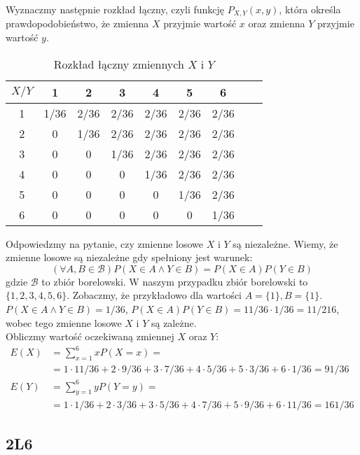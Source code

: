 \documentclass{article}
\begin{document}
\noindent
Wyznaczmy następnie rozkład łączny, czyli funkcję $P_{X,Y}(x,y)$, która określa prawdopodobieństwo, że zmienna $X$ przyjmie wartość $x$ oraz zmienna $Y$ przyjmie wartość $y$.
\begin{table}[h]
    \centering
    \begin{tabular}{c|cccccccc}
        $X/Y$ & 1 & 2 & 3 & 4 & 5 & 6 & & \\ \toprule
        1 & 1/36 & 2/36 & 2/36 & 2/36 & 2/36 & 2/36\\
        2 & 0 & 1/36 & 2/36 & 2/36 & 2/36 & 2/36\\
        3 & 0 & 0 & 1/36 & 2/36 & 2/36 & 2/36\\
        4 & 0 & 0 & 0  & 1/36 & 2/36 & 2/36\\
        5 & 0 & 0 & 0  & 0 & 1/36 & 2/36\\
        6 & 0 & 0 & 0  & 0 & 0 & 1/36\\
    \end{tabular}
    \caption{Rozkład łączny zmiennych $X$ i $Y$}
\end{table}

\noindent
Odpowiedzmy na pytanie, czy zmienne losowe $X$ i $Y$ są niezależne. Wiemy, że zmienne losowe
są niezależne gdy spełniony jest warunek:
\[
    (\forall A,B \in \mathcal{B}) P(X\in A \land Y \in B) = P(X \in A)P(Y \in B)
\]
gdzie $\mathcal{B}$ to zbiór borelowski. W naszym przypadku zbiór borelowski to $\{1,2,3,4,5,6\}$.
Zobaczmy, że przykładowo dla wartości $A=\{1\}, B=\{1\}$. $P(X \in A \land Y \in B) = 1/36$, $P(X \in A)P(Y \in B) = 11/36 \cdot 1/36 = 11/216$,
wobec tego zmienne losowe $X$ i $Y$ są zależne.\\

\noindent
Obliczmy wartość oczekiwaną zmiennej $X$ oraz $Y$:
\begin{align}
    E(X) &= \sum_{x=1}^{6} xP(X=x)= \\
    &= 1\cdot 11/36 + 2\cdot 9/36 + 3\cdot 7/36 + 4\cdot 5/36 + 5\cdot 3/36 + 6\cdot 1/36 = 91/36 \\
    E(Y) & =\sum_{y=1}^{6} yP(Y=y)= \\
    &= 1\cdot 1/36 + 2\cdot 3/36 + 3\cdot 5/36 + 4\cdot 7/36 + 5\cdot 9/36 + 6\cdot 11/36 = 161/36
\end{align}

\subsection{2L6}
\end{document}
